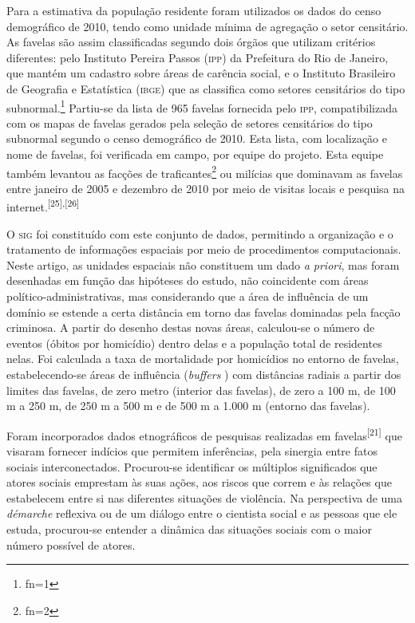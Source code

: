 \documentclass{article}
\makeatletter
\newcommand{\fn}{\afterassignment\fn@aux\count0=}
\newcommand{\fn@aux}{\csname fn\the\count0\endcsname}
\makeatother
\begin{document}
Para a estimativa da população residente foram utilizados os dados do censo
demográfico de 2010, tendo como unidade mínima de agregação o setor censitário.
As favelas são assim classificadas segundo dois órgãos que utilizam critérios
diferentes: pelo Instituto Pereira Passos (\textsc{ipp}) da Prefeitura do Rio de Janeiro,
que mantém um cadastro sobre áreas de carência social, e o Instituto Brasileiro
de Geografia e Estatística (\textsc{ibge}) que as classifica como setores censitários do
tipo subnormal.\footnote{\fn1}
Partiu-se da lista de 965 favelas fornecida pelo \textsc{ipp}, compatibilizada com os
mapas de favelas gerados pela seleção de setores censitários do tipo subnormal
segundo o censo demográfico de 2010. Esta lista, com localização e nome de
favelas, foi verificada em campo, por equipe do projeto. Esta equipe também
levantou as facções de traficantes\footnote{\fn2}
ou milícias que dominavam as favelas entre janeiro de 2005 e dezembro de 2010
por meio de visitas locais e pesquisa na
internet.\textsuperscript{[}\textsuperscript{25}\textsuperscript{]}\textsuperscript{,}\textsuperscript{[}\textsuperscript{26}\textsuperscript{]}

O \textsc{sig} foi constituído com este conjunto de dados, permitindo a organização e o
tratamento de informações espaciais por meio de procedimentos computacionais.
Neste artigo, as unidades espaciais não constituem um dado \textit{a priori}, mas foram desenhadas em função das hipóteses do estudo, não coincidente com
áreas político-administrativas, mas considerando que a área de influência de um
domínio se estende a certa distância em torno das favelas dominadas pela facção
criminosa. A partir do desenho destas novas áreas, calculou-se o número de
eventos (óbitos por homicídio) dentro delas e a população total de residentes
nelas. Foi calculada a taxa de mortalidade por homicídios no entorno de favelas,
estabelecendo-se áreas de influência (\textit{buffers}
) com distâncias radiais a partir dos limites das favelas, de zero metro
(interior das favelas), de zero a 100 m, de 100 m a 250 m, de 250 m a 500 m e de
500 m a 1.000 m (entorno das favelas).

Foram incorporados dados etnográficos de pesquisas realizadas em
favelas\textsuperscript{[}\textsuperscript{21}\textsuperscript{]}
que visaram fornecer indícios que permitem inferências, pela sinergia entre
fatos sociais interconectados. Procurou-se identificar os múltiplos significados
que atores sociais emprestam às suas ações, aos riscos que correm e às relações
que estabelecem entre si nas diferentes situações de violência. Na perspectiva
de uma \textit{démarche}
reflexiva ou de um diálogo entre o cientista social e as pessoas que ele estuda,
procurou-se entender a dinâmica das situações sociais com o maior número
possível de atores.
\end{document}
